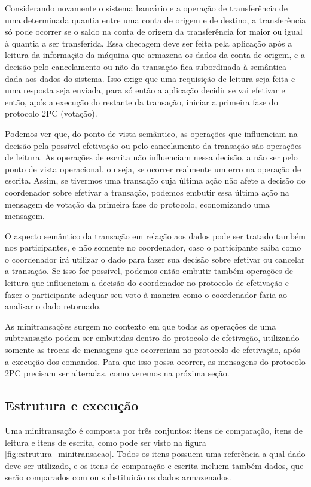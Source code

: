 \documentclass[11pt,twoside,a4paper]{book}
\begin{document}
Considerando novamente o sistema bancário e a operação de transferência de uma determinada quantia entre uma conta de origem e de destino, a transferência só pode ocorrer se o saldo na conta de origem da transferência for maior ou igual à quantia a ser transferida. Essa checagem deve ser feita pela aplicação após a leitura da informação da máquina que armazena os dados da conta de origem, e a decisão pelo cancelamento ou não da transação fica subordinada à semântica dada aos dados do sistema. Isso exige que uma requisição de leitura seja feita e uma resposta seja enviada, para só então a aplicação decidir se vai efetivar e então, após a execução do restante da transação, iniciar a primeira fase do protocolo 2PC (votação).

Podemos ver que, do ponto de vista semântico, as operações que influenciam na decisão pela possível efetivação ou pelo cancelamento da transação são operações de leitura. As operações de escrita não influenciam nessa decisão, a não ser pelo ponto de vista operacional, ou seja, se ocorrer realmente um erro na operação de escrita. Assim, se tivermos uma transação cuja última ação não afete a decisão do coordenador sobre efetivar a transação, podemos embutir essa última ação na mensagem de votação da primeira fase do protocolo, economizando uma mensagem.

O aspecto semântico da transação em relação aos dados pode ser tratado também nos participantes, e não somente no coordenador, caso o participante saiba como o coordenador irá utilizar o dado para fazer sua decisão sobre efetivar ou cancelar a transação. Se isso for possível, podemos então embutir também operações de leitura que influenciam a decisão do coordenador no protocolo de efetivação e fazer o participante adequar seu voto à maneira como o coordenador faria ao analisar o dado retornado.

As minitransações surgem no contexto em que todas as operações de uma subtransação podem ser embutidas dentro do protocolo de efetivação, utilizando somente as trocas de mensagens que ocorreriam no protocolo de efetivação, após a execução dos comandos. Para que isso possa ocorrer, as mensagens do protocolo 2PC precisam ser alteradas, como veremos na próxima seção.

\subsection{Estrutura e execução}
\label{subsec:estrutura-minitransacoes}
Uma minitransação é composta por três conjuntos: itens de comparação, itens de leitura e itens de escrita, como pode ser visto na figura \ref{fig:estrutura_minitransacao}. Todos os itens possuem uma referência a qual dado deve ser utilizado, e os itens de comparação e escrita incluem também dados, que serão comparados com ou substituirão os dados armazenados. 
\end{document}
